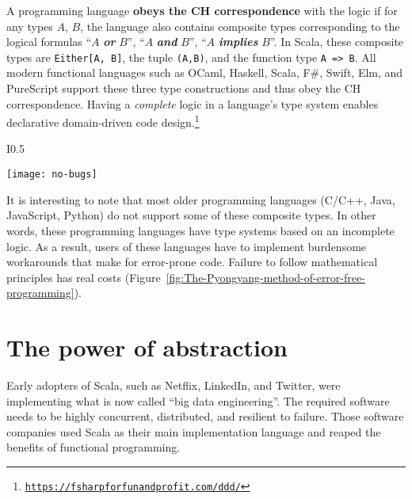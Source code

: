 A programming language \textbf{obeys the CH correspondence}
with the logic if for any types $A$, $B$, the language also contains
composite types corresponding to the logical formulas \textsf{``}$A$ \textbf{\emph{or}}
$B$\textsf{''}, \textsf{``}$A$ \textbf{\emph{and}} $B$\textsf{''}, \textsf{``}$A$ \textbf{\emph{implies}}
$B$\textsf{''}. In Scala, these composite types are \lstinline!Either[A, B]!,
the tuple \lstinline!(A,B)!, and the function type \lstinline!A => B!.
All modern functional languages such as OCaml, Haskell, Scala, F\#,
Swift, Elm, and PureScript support these three type constructions
and thus obey the CH correspondence. Having a \emph{complete} logic
in a language\textsf{'}s type system enables declarative domain-driven code
design.\footnote{\texttt{\href{https://fsharpforfunandprofit.com/ddd/}{https://fsharpforfunandprofit.com/ddd/}}}

\begin{wrapfigure}{I}{0.5\columnwidth}%
\begin{centering}
\vspace{-0.5\baselineskip}
\texttt{[image: no-bugs]}\vspace{-0.5\baselineskip}
\par\end{centering}
\caption{The Pyongyang method of error-free software engineering.\label{fig:The-Pyongyang-method-of-error-free-programming}}
\vspace{-3\baselineskip}
\end{wrapfigure}%

It is interesting to note that most older programming languages (C/C++,
Java, JavaScript, Python) do not support some of these composite types.
In other words, these programming languages have type systems based
on an incomplete logic. As a result, users of these languages have
to implement burdensome workarounds that make for error-prone code.
Failure to follow mathematical principles has real costs (Figure~\ref{fig:The-Pyongyang-method-of-error-free-programming}).

\section{The power of abstraction}

Early adopters of Scala, such as Netflix, LinkedIn, and Twitter, were
implementing what is now called \textsf{``}big data engineering\textsf{''}. The required
software needs to be highly concurrent, distributed, and resilient
to failure. Those software companies used Scala as their main implementation
language and reaped the benefits of functional programming.

